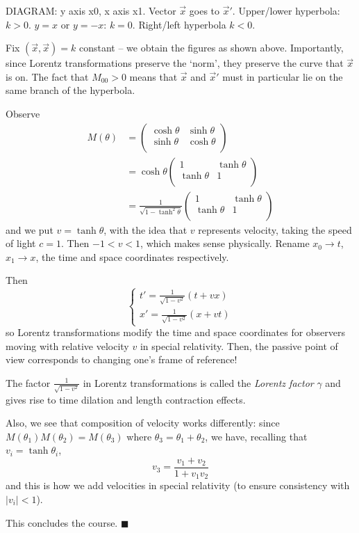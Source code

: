 \documentclass{../template/note}
\begin{document}
    DIAGRAM: y axis x0, x axis x1. Vector \(\vec x\) goes to \(\vec x'\).
    Upper/lower hyperbola: \(k > 0\). \(y=x\) or \(y=-x\): \(k = 0\). Right/left hyperbola \(k < 0\).

    Fix \((\vec x, \vec x) = k\) constant -- we obtain the figures as shown above. Importantly, since Lorentz transformations preserve the `norm', they preserve the curve that \(\vec x\) is on. The fact that \(M_{00} > 0\) means that \(\vec x\) and \(\vec x'\) must in particular lie on the same branch of the hyperbola.

    Observe
    \begin{align*}
        M(\theta) &= \begin{pmatrix}
         \cosh \theta & \sinh \theta \\
         \sinh \theta & \cosh \theta \\
        \end{pmatrix} \\
        &= \cosh \theta \begin{pmatrix}
         1 & \tanh \theta \\
         \tanh \theta & 1 \\
        \end{pmatrix} \\
        &= \frac{1}{\sqrt{1-\tanh^2\theta}} \begin{pmatrix}
         1 & \tanh \theta \\
         \tanh \theta & 1 \\
        \end{pmatrix}
    \end{align*}
    and we put \(v = \tanh \theta\), with the idea that \(v\) represents velocity, taking the speed of light \(c=1\). Then \(-1 < v < 1\), which makes sense physically. Rename \(x_0 \to t\), \(x_1 \to x\), the time and space coordinates respectively.
    
    Then
    \[
        \begin{cases}
            t' = \frac{1}{\sqrt{1-v^2}}(t+vx) \\
            x' = \frac{1}{\sqrt{1-v^2}}(x+vt)
        \end{cases}
    \]
    so Lorentz transformations modify the time and space coordinates for observers moving with relative velocity \(v\) in special relativity. Then, the passive point of view corresponds to changing one's frame of reference!

    The factor \(\frac{1}{\sqrt{1-v^2}}\) in Lorentz transformations is called the \emph{Lorentz factor} \(\gamma\) and gives rise to time dilation and length contraction effects.

    Also, we see that composition of velocity works differently: since \(M(\theta_1)M(\theta_2) = M(\theta_3)\) where \(\theta_3 = \theta_1 + \theta_2\), we have, recalling that \(v_i = \tanh \theta_i\),
    \[
        v_3 = \frac{v_1+v_2}{1+v_1v_2}
    \]
    and this is how we add velocities in special relativity (to ensure consistency with \(|v_i| < 1\)).

    This concludes the course. \(\blacksquare\)
    
    
\end{document}
